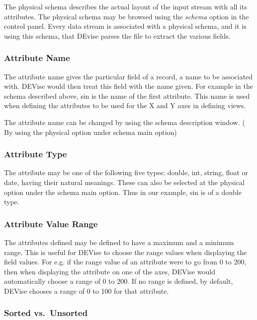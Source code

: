  The physical schema describes the actual layout of the input stream with all its attributes. The physical schema may be browsed using the {\em schema} option in the control panel. Every data stream is associated with a physical schema, and it is using this schema, that DEvise parses the file to extract the various fields.


\subsubsection{Attribute Name}

 The attribute name gives the particular field of a record, a name to be associated with. DEVise would then treat this field with the name given. For example in the schema described above, sin is the name of the first attribute. This name is used when defining the attributes to be used for the X and Y axes in defining views.

 The attribute name can be changed by using the schema description window. ( By using the physical option under schema main option) 


\subsubsection{Attribute Type}

 The attribute may be one of the following five types: double, int, string, float or date, having their natural meanings. These can also be selected at the physical option under the schema main option. Thus in our example, sin is of a double type.

\subsubsection{Attribute Value Range}

 The attributes defined may be defined to have a maximum and a minimum range. This is useful for DEVise to choose the range values when displaying the field values. For e.g. if the range value of an attribute were to go from 0 to 200, then when displaying the attribute on one of the axes, DEVise would automatically choose a range of 0 to 200. If no range is defined, by default, DEVise chooses a range of 0 to 100 for that attribute.

\subsubsection{Sorted vs.\ Unsorted}

